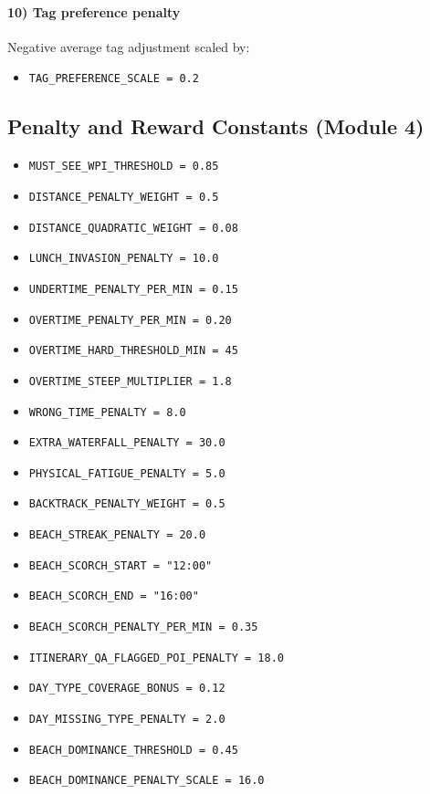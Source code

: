 \documentclass[11pt]{article}
\begin{document}
\paragraph{10) Tag preference penalty}
Negative average tag adjustment scaled by:
\begin{itemize}
  \item \texttt{TAG\_PREFERENCE\_SCALE = 0.2}
\end{itemize}

\subsection{Penalty and Reward Constants (Module 4)}
\begin{itemize}
  \item \texttt{MUST\_SEE\_WPI\_THRESHOLD = 0.85}
  \item \texttt{DISTANCE\_PENALTY\_WEIGHT = 0.5}
  \item \texttt{DISTANCE\_QUADRATIC\_WEIGHT = 0.08}
  \item \texttt{LUNCH\_INVASION\_PENALTY = 10.0}
  \item \texttt{UNDERTIME\_PENALTY\_PER\_MIN = 0.15}
  \item \texttt{OVERTIME\_PENALTY\_PER\_MIN = 0.20}
  \item \texttt{OVERTIME\_HARD\_THRESHOLD\_MIN = 45}
  \item \texttt{OVERTIME\_STEEP\_MULTIPLIER = 1.8}
  \item \texttt{WRONG\_TIME\_PENALTY = 8.0}
  \item \texttt{EXTRA\_WATERFALL\_PENALTY = 30.0}
  \item \texttt{PHYSICAL\_FATIGUE\_PENALTY = 5.0}
  \item \texttt{BACKTRACK\_PENALTY\_WEIGHT = 0.5}
  \item \texttt{BEACH\_STREAK\_PENALTY = 20.0}
  \item \texttt{BEACH\_SCORCH\_START = "12:00"}
  \item \texttt{BEACH\_SCORCH\_END = "16:00"}
  \item \texttt{BEACH\_SCORCH\_PENALTY\_PER\_MIN = 0.35}
  \item \texttt{ITINERARY\_QA\_FLAGGED\_POI\_PENALTY = 18.0}
  \item \texttt{DAY\_TYPE\_COVERAGE\_BONUS = 0.12}
  \item \texttt{DAY\_MISSING\_TYPE\_PENALTY = 2.0}
  \item \texttt{BEACH\_DOMINANCE\_THRESHOLD = 0.45}
  \item \texttt{BEACH\_DOMINANCE\_PENALTY\_SCALE = 16.0}

\end{itemize}
\end{document}
